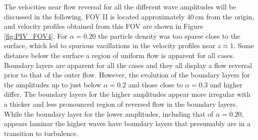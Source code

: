 \documentclass[review, authoryear]{elsarticle}
\newcommand{\cm}{\,\mbox{cm}}
\begin{document}
The velocities near flow reversal for all the different wave amplitudes will be discussed in the following. FOV II is located approximately $40\cm$ from the origin, and velocity 
profiles obtained from this FOV are shown in Figure \ref{fig:PIV_FOV4}.
For $\alpha=0.20$ the particle density was too sparse close to the surface, which led to spurious vacillations in the velocity profiles near  $z\approx1$. Some distance below the surface a region of uniform flow is apparent for all cases. 
Boundary layers are apparent for all the cases and they all
display a flow reversal prior to that of the outer flow.
However, the evolution of the boundary layers for the amplitudes up to just below
$\alpha=0.2$ and those close to $\alpha=0.3$ and higher differ.
The boundary layers for the higher amplitudes appear more irregular
with a thicker and less pronounced region of reversed flow in the 
boundary layers. 
While the boundary layer for the lower amplitudes, including that of $\alpha=0.20$, appears laminar the higher waves have boundary layers that 
presumably are in a transition to turbulence.   
\end{document}
